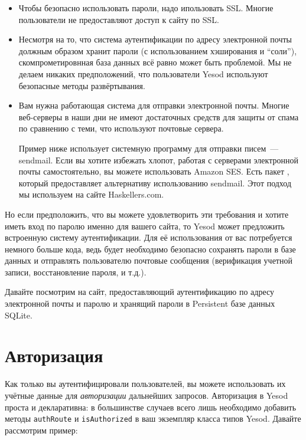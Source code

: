 \begin{itemize}
    \item Чтобы безопасно использовать пароли, надо ипользовать SSL. Многие пользователи не предоставляют доступ к сайту по SSL.

    \item Несмотря на то, что система аутентификации по адресу электронной почты должным образом хранит пароли (с использованием хэширования и ``соли''), скомпрометировнная база данных всё равно может быть проблемой. Мы не делаем никаких предположений, что пользователи Yesod используют безопасные методы развёртывания.

    \item Вам нужна работающая система для отправки электронной почты. Многие веб-серверы в наши дни не имеют достаточных средств для защиты от спама по сравнению с теми, что используют почтовые сервера.

    \begin{remark}
    Пример ниже использует системную программу для отправки писем~--- sendmail. Если вы хотите избежать хлопот, работая с серверами электронной почты самостоятельно, вы можете использовать Amazon SES. Есть пакет , который предоставляет альтернативу использованию sendmail. Этот подход мы используем на сайте Haskellers.com.
    \end{remark}
\end{itemize}

Но если предположить, что вы можете удовлетворить эти требования и хотите иметь вход по паролю именно для вашего сайта, то Yesod может предложить встроенную систему аутентификации. Для её использования от вас потребуется немного больше кода, ведь будет необходимо безопасно сохранять пароли в базе данных и отправлять пользователю почтовые сообщения (верификация учетной записи, восстановление пароля, и т.д.).

Давайте посмотрим на сайт, предоставляющий аутентификацию по адресу электронной почты и паролю и хранящий пароли в Persistent базе данных SQLite.


\section{Авторизация}
Как только вы аутентифицировали пользователей, вы можете использовать их учётные данные для \emph{авторизации} дальнейших запросов. Авторизация в Yesod проста и декларативна: в большинстве случаев всего лишь необходимо добавить методы \lstinline'authRoute' и \lstinline'isAuthorized' в ваш экземпляр класса типов Yesod. Давайте рассмотрим пример:

